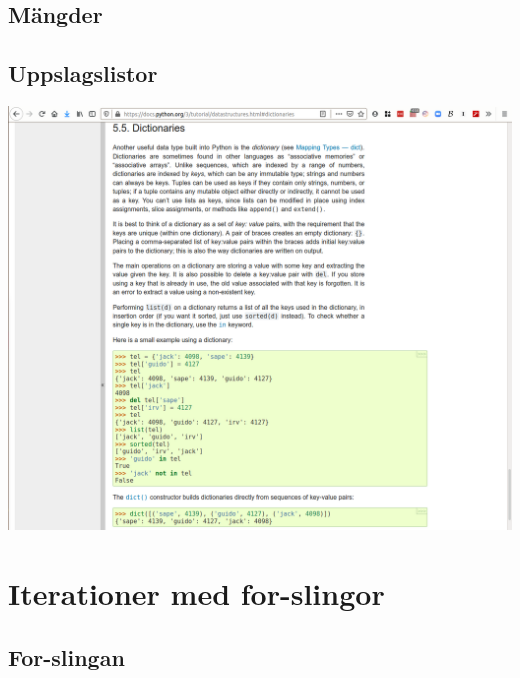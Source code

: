 \subsection{Mängder}

\begin{frame}[fragile]
  \begin{example}[sets.py]
    
  \end{example}
\end{frame}


\subsection{Uppslagslistor}

\begin{frame}
  \includegraphics[width=\columnwidth]{figs/docs-dicts.png}
\end{frame}

\begin{frame}[fragile]
  \begin{example}[phone.py]
    
  \end{example}
\end{frame}


\section{Iterationer med for-slingor}

\subsection{For-slingan}

